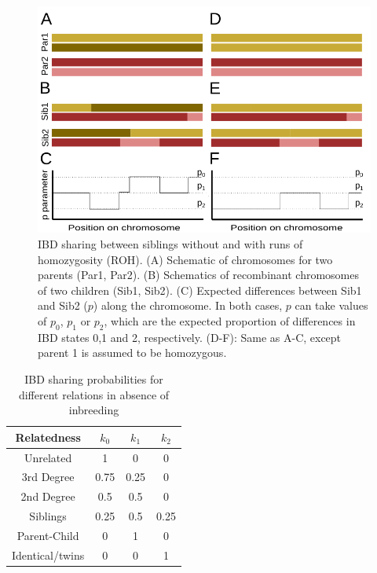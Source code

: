 \documentclass[12pt, letterpaper]{article}
\begin{document}
\begin{figure}[ht!]
    \includegraphics[width=16.5cm]{plots/inkscape_finalImg/schematic_sib_rev.png}
    \centering
    \caption{IBD sharing between siblings without and with runs of homozygosity (ROH). (A) Schematic of chromosomes for two parents (Par1, Par2). (B) Schematics of recombinant chromosomes of two children (Sib1, Sib2). (C)  Expected differences between Sib1 and Sib2 ($p$) along the chromosome. In both cases, $p$ can take values of $p_0$, $p_1$ or $p_2$, which are the expected proportion of differences in IBD states 0,1 and 2, respectively.  (D-F): Same as A-C, except parent 1 is assumed to be homozygous.}
    \label{fig0:schematic}
\end{figure}


\begin{table}[ht!]
\caption{\label{tab:Table 1}IBD sharing probabilities for different relations in absence of inbreeding}
\begin{tabular}{|c|c|c|c|}
    \hline
    Relatedness & $k_0$ & $k_1$ & $k_2$\\
    \hline
    Unrelated & 1 & 0 & 0\\
    \hline
    3rd Degree & 0.75 & 0.25 & 0\\
    \hline
    2nd Degree & 0.5 & 0.5 & 0\\
    \hline
    Siblings & 0.25 & 0.5 & 0.25\\
    \hline
    Parent-Child & 0 & 1 & 0\\
    \hline
    Identical/twins & 0 & 0 & 1\\
    \hline
\end{tabular}
\label{table1}
\end{table}
\end{document}
